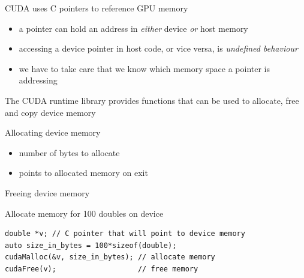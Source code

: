 \begin{frame}[fragile]{}
    \begin{info}{CUDA uses C pointers to reference GPU memory}
        \centering {}
        \begin{itemize}
            \item a pointer can hold an address in \emph{either} device \emph{or} host memory
            \item accessing a device pointer in host code, or vice versa, is \emph{undefined behaviour}
            \item we have to take care that we know which memory space a pointer is addressing
        \end{itemize}
        The CUDA runtime library provides functions that can be used to allocate, free and copy device memory
    \end{info}

\end{frame}

\begin{frame}[fragile]{}
    \begin{info}{Allocating device memory}
        \centering {}
    \begin{itemize}
        \item {} number of bytes to allocate
        \item {} points to allocated memory on exit
    \end{itemize}
    \end{info}

    \begin{info}{Freeing device memory}
        \centering {}
    \end{info}

    \begin{code}{Allocate memory for 100 doubles on device}
        \begin{lstlisting}[style=boxcuda]
double *v; // C pointer that will point to device memory
auto size_in_bytes = 100*sizeof(double);
cudaMalloc(&v, size_in_bytes); // allocate memory
cudaFree(v);                   // free memory
\end{lstlisting}
    \end{code}
\end{frame}

